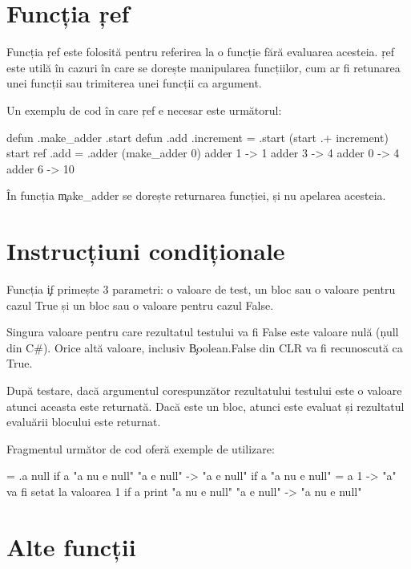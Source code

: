 \documentclass[12pt,a4paper]{memoir}
\begin{document}

\section{Funcția \c{ref}}

Funcția \c{ref} este folosită pentru referirea la o funcție fără evaluarea acesteia. \c{ref} este utilă în cazuri în care se dorește manipularea funcțiilor, cum ar fi retunarea unei funcții sau trimiterea unei funcții ca argument. 

Un exemplu de cod în care \c{ref} e necesar este următorul:
\begin{code}
defun .make_adder .start {
  defun .add .increment {
    = .start (start .+ increment)
    start
  }
  ref .add
}
= .adder (make_adder 0)
adder 1 -> 1
adder 3 -> 4
adder 0 -> 4
adder 6 -> 10
\end{code}

În funcția \c{make\_adder} se dorește returnarea funcției, și nu apelarea acesteia.

\section{Instrucțiuni condiționale}

Funcția \c{if} primește 3 parametri: o valoare de test, un bloc sau o valoare pentru cazul True și un bloc sau o valoare pentru cazul False. 

Singura valoare pentru care rezultatul testului va fi False este valoare nulă (\c{null} din C\#). Orice altă valoare, inclusiv \c{Boolean.False} din CLR va fi recunoscută ca True.

După testare, dacă argumentul corespunzător rezultatului testului este o valoare atunci aceasta este returnată. Dacă este un bloc, atunci este evaluat și rezultatul evaluării blocului este returnat.

Fragmentul următor de cod oferă exemple de utilizare:
\begin{code}
= .a null
if a "a nu e null" "a e null"
  -> "a e null"
if a "a nu e null" { = a 1 }
  -> "a" va fi setat la valoarea 1
if a { print "a nu e null" } { "a e null" }
  -> "a nu e null"
\end{code}


\section{Alte funcții}
\end{document}
